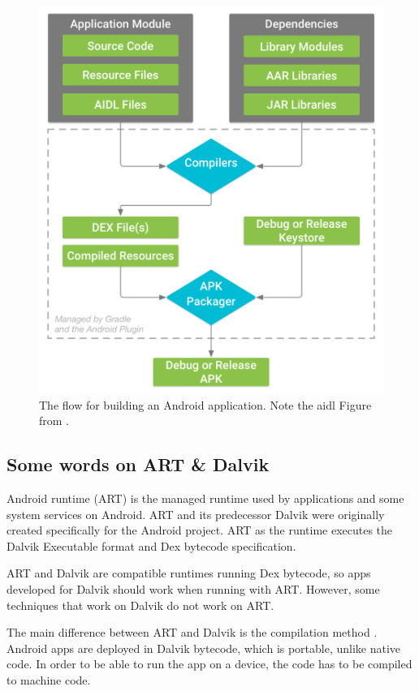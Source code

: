 \begin{figure}[hb]
	\includegraphics[width=\textwidth]{images/hello/development.png}
	\caption{The flow for building an Android application. Note the \gls{aidl} Figure from \cite{Developers2018build}. }
		\label{fig:develop}
\end{figure}

\subsection{Some words on ART \& Dalvik}
Android runtime (ART) \cite{Android2019} is the managed runtime used by applications and some system services on Android. ART and its predecessor Dalvik were originally created specifically for the Android project. ART as the runtime executes the Dalvik Executable format and Dex bytecode specification.

ART and Dalvik are compatible runtimes running Dex bytecode, so apps developed for Dalvik should work when running with ART. However, some techniques that work on Dalvik do not work on ART. 

The main difference between ART and Dalvik is the compilation method \cite{Vitas2013}. Android apps are deployed in Dalvik bytecode, which is portable, unlike native code. In order to be able to run the app on a device, the code has to be compiled to machine code.

